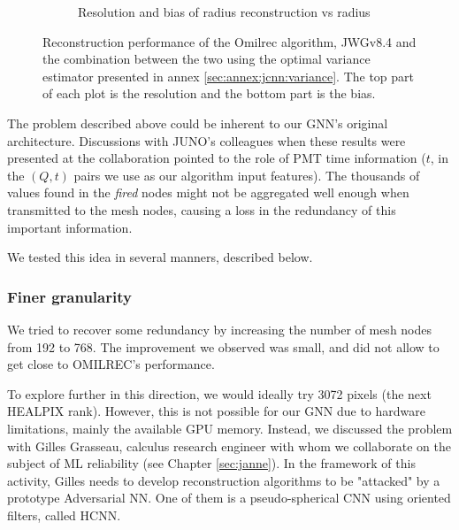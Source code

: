 \documentclass[../main.tex]{subfiles}
\begin{document}
\begin{figure}[ht]
\begin{subfigure}[t]{0.48\linewidth}
    \caption{Resolution and bias of radius reconstruction vs radius}
    \label{fig:jgnn:MSBvRTC}
  \end{subfigure}
  \caption{Reconstruction performance of the Omilrec algorithm, JWGv8.4 and the combination between the two using the optimal variance estimator presented in annex \ref{sec:annex:jcnn:variance}. The top part of each plot is the resolution and the bottom part is the bias.}
  \label{fig:jgnn:results_2}
\end{figure}

The problem described above could be inherent to our GNN's original architecture. Discussions with JUNO's colleagues when these results were presented at the collaboration pointed to the role of PMT time information ($t$, in the $(Q,t)$ pairs we use as our algorithm input features). The thousands of values found in the \textit{fired} nodes might not be aggregated well enough when transmitted to the mesh nodes, causing a loss in the redundancy of this important information.

We tested this idea in several manners, described below.

\subsubsection{Finer granularity}

We tried to recover some redundancy by increasing the number of mesh nodes from 192 to 768. The improvement we observed was small, and did not allow to get close to OMILREC's performance.

To explore further in this direction, we would ideally try 3072 pixels (the next HEALPIX rank). However, this is not possible for our GNN due to hardware limitations, mainly the available GPU memory. Instead, we discussed the problem with Gilles Grasseau, calculus research engineer with whom we collaborate on the subject of ML reliability (see Chapter \ref{sec:janne}). In the framework of this activity, Gilles needs to develop reconstruction algorithms to be "attacked" by a prototype Adversarial NN. One of them is a pseudo-spherical CNN using oriented filters, called HCNN.
\end{document}
